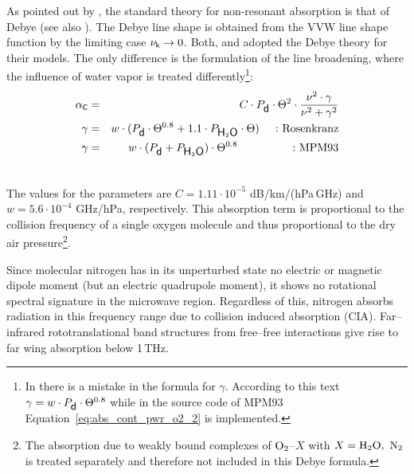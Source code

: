 {
\label{leveld:o2cont}
As pointed out by \citet{vv:87}, the standard theory for
non-resonant absorption is that of Debye (see also \citet{townes:55}). 
The Debye line shape is obtained from the VVW line shape function 
by the limiting case $\nu_{\sf k} \rightarrow 0$.
Both, \citet{liebeetal:93} and \citet{pwr:93} adopted the
Debye theory for their models. The only difference is the formulation
of the line broadening, where the influence of water vapor is treated 
differently\footnote{In \citet{liebeetal:93} there is a mistake in the formula
  for $\gamma$. According to this text $\gamma =
  w\cdot P_{\mbox{\sf d}}\cdot\Theta^{0.8}$ while in the source code of MPM93 
  Equation~\ref{eq:abs_cont_pwr_o2_2} is implemented.}: 
\begin{eqnarray}
  \label{eq:abs_cont_pwr_o2}
  \alphac &=&  C \cdot \pda \cdot \Theta^2 \cdot 
             \frac{\nu^2 \cdot \gamma}{\nu^2+\gamma^2}\\
  \label{eq:abs_cont_pwr_o2_1}
  \gamma &=&  w \cdot (\pda \cdot \Theta^{0.8} + 1.1 \cdot \phzo \cdot
  \Theta)\hspace*{5mm}\mbox{:~Rosenkranz}\\
  \label{eq:abs_cont_pwr_o2_2}
  \gamma &=&  w \cdot (\pda + \phzo) \cdot \Theta^{0.8}\hspace*{17.25mm}\mbox{:~MPM93}\\
\nonumber
\end{eqnarray}

The values for the parameters are $C = 1.11\cdot 10^{-5}$ dB/km/(hPa\,GHz) and 
$w = 5.6 \cdot 10^{-4}$ GHz/hPa, respectively. This absorption
term is proportional to the collision frequency of a single oxygen molecule
and thus proportional to the dry air pressure\footnote{The absorption
  due to weakly bound complexes of $\mbox{O}_2$--$X$ with $X=\mbox{H}_2\mbox{O},~\mbox{N}_2$ is 
  treated separately and therefore not included in this Debye formula.}.




\label{leveld:n2cont}
Since molecular nitrogen has in its unperturbed state no electric or 
magnetic dipole moment (but an electric quadrupole moment), it shows 
no rotational spectral signature in the microwave region. Regardless 
of this, nitrogen absorbs radiation in this frequency range due to 
collision induced absorption (CIA). Far--infrared rototranslational
band structures from free--free interactions give rise to far wing
absorption below 1\,THz.

}
